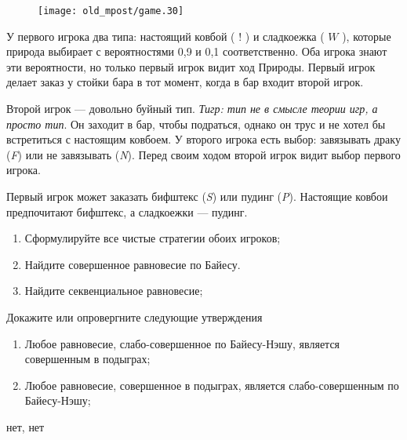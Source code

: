 \begin{problem}

\begin{figure}[htbp]
     \texttt{[image: old\_mpost/game.30]}
\end{figure}

У первого игрока два типа: настоящий ковбой ( $!$ ) и сладкоежка ( $W$ ), которые природа выбирает с вероятностями 0,9 и 0,1 соответственно. Оба игрока знают эти вероятности, но только первый игрок видит ход Природы. Первый игрок делает заказ у стойки бара в тот момент, когда в бар входит второй игрок.\par


Второй игрок --- довольно буйный тип. {\it Тигр: тип не в смысле теории игр, а просто тип}. Он заходит в бар, чтобы подраться, однако он трус и не хотел бы встретиться с настоящим ковбоем. У второго игрока есть выбор: завязывать драку ({\it F}) или не завязывать ({\it N}). Перед своим ходом второй игрок видит выбор первого игрока.\par
Первый игрок может заказать бифштекс ({\it S}) или пудинг ({\it P}). Настоящие ковбои предпочитают бифштекс, а сладкоежки --- пудинг.
\begin{enumerate}
\item Сформулируйте все чистые стратегии обоих игроков;\par
\item Найдите совершенное равновесие по Байесу.\par
\item  Найдите секвенциальное равновесие;\par
\end{enumerate}


\begin{sol}

\end{sol}
\end{problem}



\begin{problem}
Докажите или опровергните следующие утверждения

\begin{enumerate}
\item Любое равновесие, слабо-совершенное по Байесу-Нэшу, является совершенным в подыграх;\par
\item  Любое равновесие, совершенное в подыграх, является слабо-совершенным по Байесу-Нэшу;
\end{enumerate}

\begin{sol}
нет, нет
\end{sol}
\end{problem}





